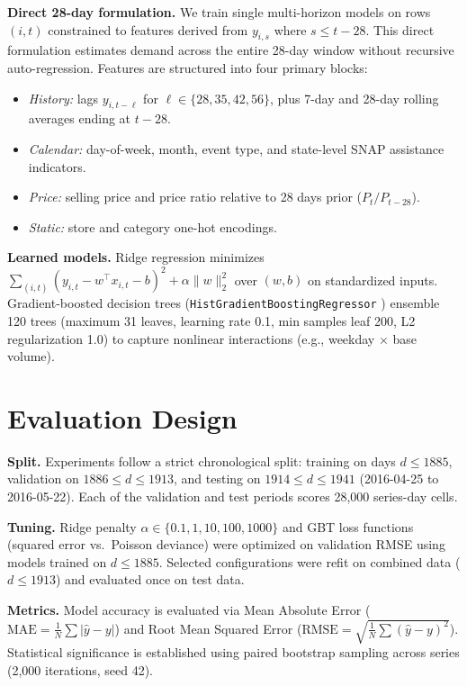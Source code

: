 \documentclass{article}
\begin{document}
\textbf{Direct 28-day formulation.} We train single multi-horizon models on rows $(i,t)$ constrained to features derived from $y_{i,s}$ where $s\le t-28$. This direct formulation estimates demand across the entire 28-day window without recursive auto-regression. Features are structured into four primary blocks:
\begin{itemize}\setlength{\itemsep}{0pt}\setlength{\parsep}{0pt}
\item \emph{History:} lags $y_{i,t-\ell}$ for $\ell\in\{28,35,42,56\}$, plus 7-day and 28-day rolling averages ending at $t-28$.
\item \emph{Calendar:} day-of-week, month, event type, and state-level SNAP assistance indicators.
\item \emph{Price:} selling price and price ratio relative to 28 days prior ($P_t/P_{t-28}$).
\item \emph{Static:} store and category one-hot encodings.
\end{itemize}

\textbf{Learned models.} Ridge regression \citep{hoerl1970} minimizes $\sum_{(i,t)}(y_{i,t}-w^\top x_{i,t}-b)^2+\alpha\lVert w\rVert_2^2$ over $(w,b)$ on standardized inputs. Gradient-boosted decision trees \citep{friedman2001} (\texttt{HistGradientBoostingRegressor} \citep{pedregosa2011}) ensemble 120 trees (maximum 31 leaves, learning rate 0.1, min samples leaf 200, L2 regularization 1.0) to capture nonlinear interactions (e.g., weekday $\times$ base volume).

\section{Evaluation Design}
\textbf{Split.} Experiments follow a strict chronological split: training on days $d\le1885$, validation on $1886\le d\le1913$, and testing on $1914\le d\le1941$ (2016-04-25 to 2016-05-22). Each of the validation and test periods scores 28,000 series-day cells.

\textbf{Tuning.} Ridge penalty $\alpha\in\{0.1,1,10,100,1000\}$ and GBT loss functions (squared error vs.\ Poisson deviance) were optimized on validation RMSE using models trained on $d\le1885$. Selected configurations were refit on combined data ($d\le1913$) and evaluated once on test data.

\textbf{Metrics.} Model accuracy is evaluated via Mean Absolute Error ($\mathrm{MAE}=\frac1N\sum|\hat y-y|$) and Root Mean Squared Error ($\mathrm{RMSE}=\sqrt{\frac1N\sum(\hat y-y)^2}$). Statistical significance is established using paired bootstrap sampling \citep{efron1979} across series (2,000 iterations, seed 42).
\end{document}

